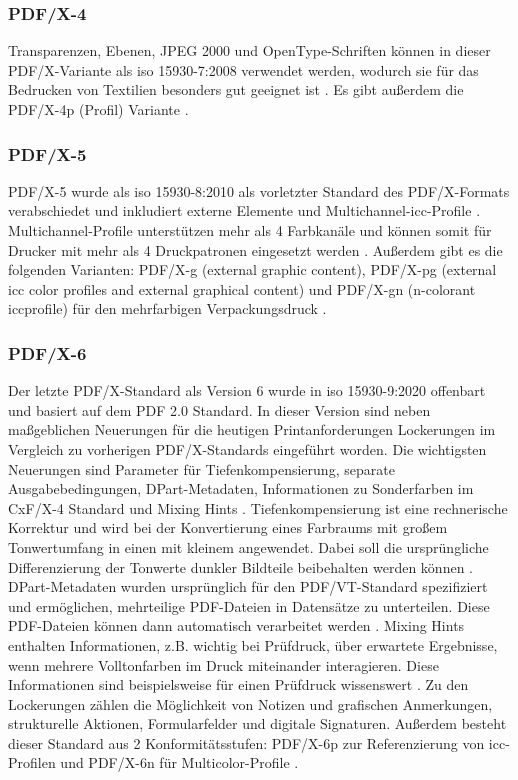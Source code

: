 \subsubsection{PDF/X-4}
Transparenzen, Ebenen, JPEG 2000 und OpenType-Schriften können in dieser PDF/X-Variante als \gls{iso} 15930-7:2008 \cite{proj-consult, schneeberger} verwendet werden, wodurch sie für das Bedrucken von Textilien besonders gut geeignet ist  \cite{adobe-pdf-x}. Es gibt außerdem die PDF/X-4p (Profil) Variante \cite{schneeberger}. 

\subsubsection{PDF/X-5}
PDF/X-5 wurde als \gls{iso} 15930-8:2010 als vorletzter Standard des PDF/X-Formats verabschiedet und inkludiert externe Elemente und Multichannel-\gls{icc}-Profile \cite{proj-consult}. Multichannel-Profile unterstützen mehr als 4 Farbkanäle und können somit für Drucker mit mehr als 4 Druckpatronen eingesetzt werden \cite{adobe-profil}. Außerdem gibt es die folgenden Varianten: PDF/X-g (external graphic content), PDF/X-pg (external \gls{icc} color profiles and external graphical content) und PDF/X-gn (n-colorant \gls{icc}profile) für den mehrfarbigen Verpackungsdruck \cite{schneeberger}.

\subsubsection{PDF/X-6}
Der letzte PDF/X-Standard als Version 6 wurde in \gls{iso} 15930-9:2020 offenbart und basiert auf dem PDF 2.0 Standard. In dieser Version sind neben maßgeblichen Neuerungen für die heutigen Printanforderungen Lockerungen im Vergleich zu vorherigen PDF/X-Standards eingeführt worden. Die wichtigsten Neuerungen sind Parameter für Tiefenkompensierung, separate Ausgabebedingungen, DPart-Metadaten, Informationen zu Sonderfarben im CxF/X-4 Standard und Mixing Hints \cite{proj-consult}.
Tiefenkompensierung ist eine rechnerische Korrektur und wird bei der Konvertierung eines Farbraums mit großem Tonwertumfang in einen mit kleinem angewendet. Dabei soll die ursprüngliche Differenzierung der Tonwerte dunkler Bildteile beibehalten werden können \cite{tiefen}. DPart-Metadaten wurden ursprünglich für den PDF/VT-Standard spezifiziert und ermöglichen, mehrteilige PDF-Dateien in Datensätze zu unterteilen. Diese PDF-Dateien können dann automatisch verarbeitet werden \cite{pdfa-dpart}.  Mixing Hints enthalten Informationen, z.B. wichtig bei Prüfdruck, über erwartete Ergebnisse, wenn mehrere Volltonfarben im Druck miteinander interagieren. Diese Informationen sind beispielsweise für einen Prüfdruck wissenswert \cite{mixing-hints}. Zu den Lockerungen zählen die Möglichkeit von Notizen und grafischen Anmerkungen, strukturelle Aktionen, Formularfelder und digitale Signaturen. Außerdem besteht dieser Standard aus 2 Konformitätsstufen: PDF/X-6p zur Referenzierung von \gls{icc}-Profilen und PDF/X-6n für Multicolor-Profile \cite{proj-consult}. 

